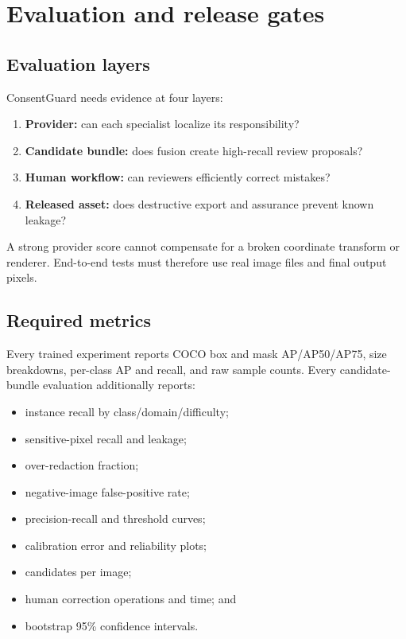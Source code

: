 \chapter{Evaluation and release gates}

\section{Evaluation layers}

ConsentGuard needs evidence at four layers:

\begin{enumerate}[leftmargin=7mm]
  \item \textbf{Provider:} can each specialist localize its responsibility?
  \item \textbf{Candidate bundle:} does fusion create high-recall review proposals?
  \item \textbf{Human workflow:} can reviewers efficiently correct mistakes?
  \item \textbf{Released asset:} does destructive export and assurance prevent known leakage?
\end{enumerate}

A strong provider score cannot compensate for a broken coordinate transform or renderer. End-to-end tests must therefore use real image files and final output pixels.

\section{Required metrics}

Every trained experiment reports COCO box and mask AP/AP50/AP75, size breakdowns, per-class AP and recall, and raw sample counts. Every candidate-bundle evaluation additionally reports:

\begin{itemize}[leftmargin=6mm]
  \item instance recall by class/domain/difficulty;
  \item sensitive-pixel recall and leakage;
  \item over-redaction fraction;
  \item negative-image false-positive rate;
  \item precision-recall and threshold curves;
  \item calibration error and reliability plots;
  \item candidates per image;
  \item human correction operations and time; and
  \item bootstrap 95\% confidence intervals.
\end{itemize}

